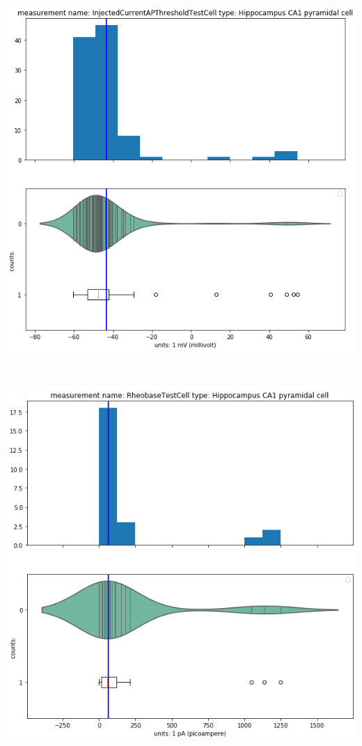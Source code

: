     \begin{center}
    \includegraphics[width=0.7\linewidth]{notebooks_converted/needata_thesis_files/needata_thesis_5_33}
    \end{center}
    { \hspace*{\fill} \\}
    
    \begin{center}
   \includegraphics[width=0.7\linewidth]{notebooks_converted/needata_thesis_files/needata_thesis_5_34}
    \end{center}
    { \hspace*{\fill} \\}
    
